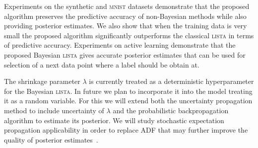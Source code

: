 \documentclass{article}
\begin{document}
Experiments on the synthetic and \textsc{mnist} datasets demonstrate that the proposed algorithm preserves the predictive accuracy of non-Bayesian methods while also providing posterior estimates. We also show that when the training data is very small the proposed algorithm significantly outperforms the classical \textsc{lista} in terms of predictive accuracy. Experiments on active learning demonstrate that the proposed Bayesian \textsc{lista} gives accurate posterior estimates that can be used for selection of a next data point where a label should be obtain at.

The shrinkage parameter $\lambda$ is currently treated as a deterministic hyperparameter for the Bayesian \textsc{lista}. In future we plan to incorporate it into the model treating it as a random variable. For this we will extend both the uncertainty propagation method to include uncertainty of $\lambda$ and the probabilistic backpropagation algorithm to estimate its posterior. We will study stochastic expectation propagation applicability in order to replace ADF that may further improve the quality of posterior estimates~\citep{li2015stochastic}.



\end{document}
